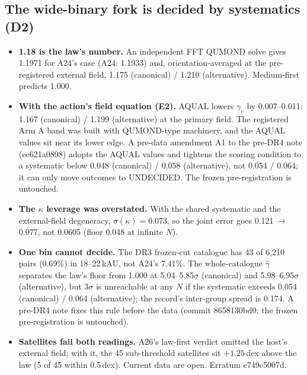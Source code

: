 \documentclass[10pt]{article}
\begin{document}
\subsection{The wide-binary fork is decided by systematics (D2)}
\begin{itemize}
\item \textbf{1.18 is the law's number.} An independent FFT QUMOND solve gives 1.1971 for A24's case (A24: 1.1933) and, orientation-averaged at the pre-registered external field, 1.175 (canonical) / 1.210 (alternative). Medium-first predicts 1.000.
\item \textbf{With the action's field equation (E2).} AQUAL lowers $\gamma_v$ by 0.007--0.011: 1.167 (canonical) / 1.199 (alternative) at the primary field. The registered Arm A band was built with QUMOND-type machinery, and the AQUAL values sit near its lower edge. A pre-data amendment A1 to the pre-DR4 note (ee621a0898) adopts the AQUAL values and tightens the scoring condition to a systematic below 0.048 (canonical) / 0.058 (alternative), not 0.054 / 0.064; it can only move outcomes to UNDECIDED. The frozen pre-registration is untouched.
\item \textbf{The $\kappa$ leverage was overstated.} With the shared systematic and the external-field degeneracy, $\sigma(\kappa)=0.073$, so the joint error goes 0.121$\,\to\,$0.077, not 0.0605 (floor 0.048 at infinite $N$).
\item \textbf{One bin cannot decide.} The DR3 frozen-cut catalogue has 43 of 6,210 pairs (0.69\%) in 18--22\,kAU, not A24's 7.41\%. The whole-catalogue $\hat\gamma$ separates the law's floor from 1.000 at 5.04--5.85$\sigma$ (canonical) and 5.98--6.95$\sigma$ (alternative), but 3$\sigma$ is unreachable at any $N$ if the systematic exceeds 0.054 (canonical) / 0.064 (alternative); the record's inter-group spread is 0.174. A pre-DR4 note fixes this rule before the data (commit 8658130bd0; the frozen pre-registration is untouched).
\item \textbf{Satellites fail both readings.} A26's law-first verdict omitted the host's external field; with it, the 45 sub-threshold satellites sit $+1.25$\,dex above the law (5 of 45 within 0.5\,dex). Current data are open. Erratum c749c5007d.
\end{itemize}
\end{document}
